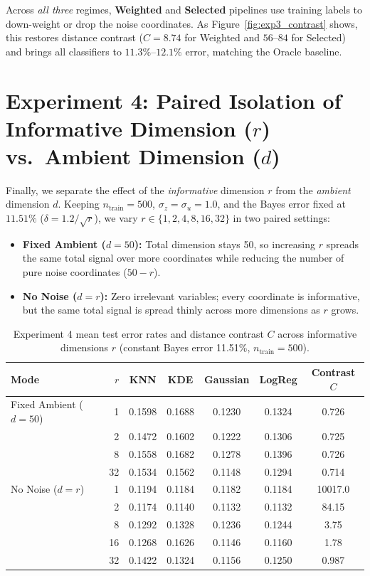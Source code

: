 \documentclass[11pt, a4paper]{article}
\begin{document}
Across \textit{all three} regimes, \textbf{Weighted} and \textbf{Selected} pipelines use training labels to down-weight or drop the noise coordinates. As Figure~\ref{fig:exp3_contrast} shows, this restores distance contrast ($C = 8.74$ for Weighted and $56$--$84$ for Selected) and brings all classifiers to $11.3\%$--$12.1\%$ error, matching the Oracle baseline.

\section{Experiment 4: Paired Isolation of Informative Dimension ($r$) vs.\ Ambient Dimension ($d$)}

Finally, we separate the effect of the \textit{informative} dimension $r$ from the \textit{ambient} dimension $d$. Keeping $n_{\text{train}} = 500$, $\sigma_z = \sigma_u = 1.0$, and the Bayes error fixed at $11.51\%$ ($\delta = 1.2 / \sqrt{r}$), we vary $r \in \{1, 2, 4, 8, 16, 32\}$ in two paired settings:
\begin{itemize}
    \item \textbf{Fixed Ambient ($d = 50$):} Total dimension stays 50, so increasing $r$ spreads the same total signal over more coordinates while reducing the number of pure noise coordinates ($50 - r$).
    \item \textbf{No Noise ($d = r$):} Zero irrelevant variables; every coordinate is informative, but the same total signal is spread thinly across more dimensions as $r$ grows.
\end{itemize}

\begin{table}[htbp]
\centering
\small
\caption{Experiment 4 mean test error rates and distance contrast $C$ across informative dimensions $r$ (constant Bayes error 11.51\%, $n_{\text{train}}=500$).}
\label{tab:exp4}
\begin{tabular}{lrccccc}
\toprule
Mode & $r$ & KNN & KDE & Gaussian & LogReg & Contrast $C$ \\
\midrule
Fixed Ambient ($d=50$) & 1  & 0.1598 & 0.1688 & 0.1230 & 0.1324 & 0.726 \\
                       & 2  & 0.1472 & 0.1602 & 0.1222 & 0.1306 & 0.725 \\
                       & 8  & 0.1558 & 0.1682 & 0.1278 & 0.1396 & 0.726 \\
                       & 32 & 0.1534 & 0.1562 & 0.1148 & 0.1294 & 0.714 \\
\midrule
No Noise ($d=r$)       & 1  & 0.1194 & 0.1184 & 0.1182 & 0.1184 & 10017.0 \\
                       & 2  & 0.1174 & 0.1140 & 0.1132 & 0.1132 & 84.15 \\
                       & 8  & 0.1292 & 0.1328 & 0.1236 & 0.1244 & 3.75 \\
                       & 16 & 0.1268 & 0.1626 & 0.1146 & 0.1160 & 1.78 \\
                       & 32 & 0.1422 & 0.1324 & 0.1156 & 0.1250 & 0.987 \\
\bottomrule
\end{tabular}
\end{table}
\end{document}
